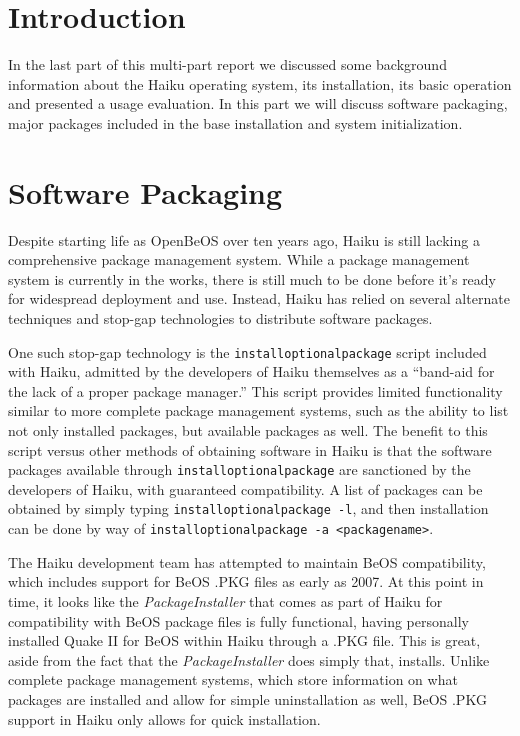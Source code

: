\documentclass{article}
\begin{document}
\maketitle

\section{Introduction}

In the last part of this multi-part report we discussed some
background information about the Haiku operating system, its
installation, its basic operation and presented a usage evaluation.
In this part we will discuss software packaging, major packages
included in the base installation and system initialization.

\section{Software Packaging}

Despite starting life as OpenBeOS over ten years ago, Haiku is still lacking a comprehensive package management system. While a package management system is currently in the works\cite{HaikuFuturePkgMan}, there is still much to be done before it's ready for widespread deployment and use\cite{HaikuPkgTodo}. Instead, Haiku has relied on several alternate techniques and stop-gap technologies to distribute software packages.

One such stop-gap technology is the \texttt{installoptionalpackage} script included with Haiku, admitted by the developers of Haiku themselves as a ``band-aid for the lack of a proper package manager.''\cite{InstallOptionalPackage} This script provides limited functionality similar to more complete package management systems, such as the ability to list not only installed packages, but available packages as well. The benefit to this script versus other methods of obtaining software in Haiku is that the software packages available through \texttt{installoptionalpackage} are sanctioned by the developers of Haiku, with guaranteed compatibility. A list of packages can be obtained by simply typing \texttt{installoptionalpackage -l}, and then installation can be done by way of \texttt{installoptionalpackage -a <packagename>}.

The Haiku development team has attempted to maintain BeOS compatibility, which includes support for BeOS .PKG files as early as 2007.\cite{OpeningPkgFiles} At this point in time, it looks like the \textit{PackageInstaller} that comes as part of Haiku for compatibility with BeOS package files is fully functional, having personally installed Quake II for BeOS within Haiku through a .PKG file. This is great, aside from the fact that the \textit{PackageInstaller} does simply that, installs. Unlike complete package management systems, which store information on what packages are installed and allow for simple uninstallation as well, BeOS .PKG support in Haiku only allows for quick installation.
\end{document}
